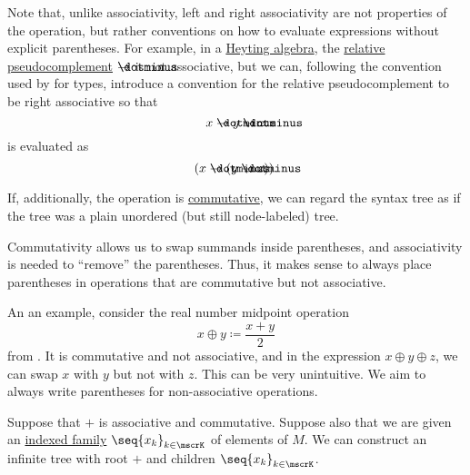 \begin{remark}
\begin{thmenum}
    Note that, unlike associativity, left and right associativity are not properties of the operation, but rather conventions on how to evaluate expressions without explicit parentheses. For example, in a \hyperref[def:heyting_algebra]{Heyting algebra}, the \hyperref[def:heyting_algebra]{relative pseudocomplement} \( \synimplies \) is not associative, but we can, following the convention used by  for types, introduce a convention for the relative pseudocomplement to be right associative so that
    \begin{equation*}
      x \synimplies y \synimplies z
    \end{equation*}
    is evaluated as
    \begin{equation*}
      (x \synimplies (y \synimplies z)).
    \end{equation*}

     If, additionally, the operation is \hyperref[def:binary_operation/commutative]{commutative}, we can regard the syntax tree as if the tree was a plain unordered (but still node-labeled) tree.

    Commutativity allows us to swap summands inside parentheses, and associativity is needed to \enquote{remove} the parentheses. Thus, it makes sense to always place parentheses in operations that are commutative but not associative.

    An an example, consider the real number midpoint operation
    \begin{equation*}
      x \oplus y \coloneqq \frac {x + y} 2
    \end{equation*}
    from . It is commutative and not associative, and in the expression \( x \oplus y \oplus z \), we can swap \( x \) with \( y \) but not with \( z \). This can be very unintuitive. We aim to always write parentheses for non-associative operations.

     Suppose that \( + \) is associative and commutative. Suppose also that we are given an \hyperref[def:indexed_family]{indexed family} \( \seq{ x_k }_{k \in \mscrK} \) of elements of \( M \). We can construct an infinite tree with root \( + \) and children \( \seq{ x_k }_{k \in \mscrK} \).


\end{thmenum}
\end{remark}

